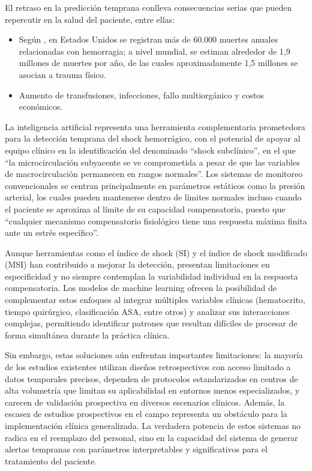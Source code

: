 \documentclass[12pt, letterpaper]{article}
\begin{document}
El retraso en la predicción temprana conlleva consecuencias serias que pueden repercutir en la salud del paciente, entre ellas:

\begin{itemize}
    \item Según \cite{cannon2018}, en Estados Unidos se registran más de 60.000 muertes anuales relacionadas con hemorragia; a nivel mundial, se estiman alrededor de 1,9 millones de muertes por año, de las cuales aproximadamente 1,5 millones se asocian a trauma físico.
    \item Aumento de transfusiones, infecciones, fallo multiorgánico y costos económicos.
\end{itemize}

La inteligencia artificial representa una herramienta complementaria prometedora para la detección temprana del shock hemorrágico, con el potencial de apoyar al equipo clínico en la identificación del denominado ``shock subclínico'', en el que ``la microcirculación subyacente se ve comprometida a pesar de que las variables de macrocirculación permanecen en rangos normales''. Los sistemas de monitoreo convencionales se centran principalmente en parámetros estáticos como la presión arterial, los cuales pueden mantenerse dentro de límites normales incluso cuando el paciente se aproxima al límite de su capacidad compensatoria, puesto que ``cualquier mecanismo compensatorio fisiológico tiene una respuesta máxima finita ante un estrés específico''.

Aunque herramientas como el índice de shock (SI) y el índice de shock modificado (MSI) han contribuido a mejorar la detección, presentan limitaciones en especificidad y no siempre contemplan la variabilidad individual en la respuesta compensatoria. Los modelos de machine learning ofrecen la posibilidad de complementar estos enfoques al integrar múltiples variables clínicas (hematocrito, tiempo quirúrgico, clasificación ASA, entre otros) y analizar sus interacciones complejas, permitiendo identificar patrones que resultan difíciles de procesar de forma simultánea durante la práctica clínica.

Sin embargo, estas soluciones aún enfrentan importantes limitaciones: la mayoría de los estudios existentes utilizan diseños retrospectivos con acceso limitado a datos temporales precisos, dependen de protocolos estandarizados en centros de alta volumetría que limitan su aplicabilidad en entornos menos especializados, y carecen de validación prospectiva en diversos escenarios clínicos. Además, la escasez de estudios prospectivos en el campo representa un obstáculo para la implementación clínica generalizada. La verdadera potencia de estos sistemas no radica en el reemplazo del personal, sino en la capacidad del sistema de generar alertas tempranas con parámetros interpretables y significativos para el tratamiento del paciente.
\end{document}
